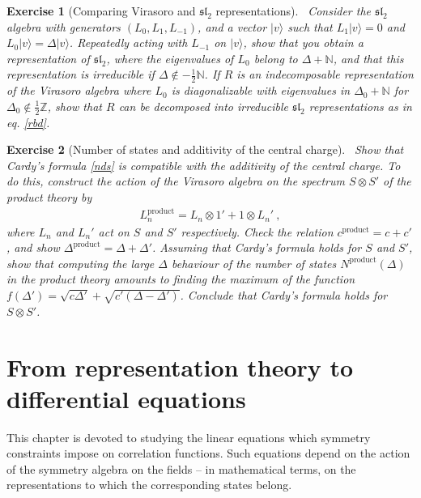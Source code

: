 \documentclass[12pt,a4paper,notitlepage]{report}
\numberwithin{equation}{section}
\theoremstyle{break}
\newtheorem{exo}{Exercise}[chapter]
\begin{document}
\begin{exo}[Comparing Virasoro and $\mathfrak{sl}_2$ representations]
 ~\label{exodis}
Consider the $\mathfrak{sl}_2$ algebra with generators $(L_0,L_1,L_{-1})$, and a vector $|v\rangle$ such that $L_1|v\rangle = 0 $ and $L_0|v\rangle = \Delta |v\rangle$.
Repeatedly acting with $L_{-1}$ on $|v\rangle$, show that you obtain a representation of $\mathfrak{sl}_2$, where the eigenvalues of $L_0$ belong to $\Delta+{\mathbb{N}}$, and that this representation is irreducible if $\Delta\notin -\frac12 \mathbb{N}$.
If $R$ is an indecomposable representation of the Virasoro algebra where $L_0$ is diagonalizable with eigenvalues in $\Delta_0+\mathbb{N}$ for $\Delta_0\notin\frac12 \mathbb{Z}$, show that $R$ can be decomposed into irreducible $\mathfrak{sl}_2$ representations as in eq. \eqref{rbd}.
\end{exo}


\begin{exo}[Number of states and additivity of the central charge]
 ~\label{exoacf} 
Show that Cardy's formula \eqref{nds} is compatible with the additivity of the central charge.
To do this, construct the action of the Virasoro algebra on the spectrum $S\otimes S'$ of the product theory by 
\begin{align}
 L_n^\text{product} = L_n\otimes 1' + 1\otimes L_n'\ ,
\end{align}
where $L_n$ and $L_n'$ act on $S$ and $S'$ respectively.
Check the relation $c^\text{product} = c+c'$, and show $\Delta^\text{product} = \Delta+\Delta'$.
Assuming that Cardy's formula holds for $S$ and $S'$, show that computing the large $\Delta$ behaviour of the number of states $N^\text{product}(\Delta)$ in the product theory amounts to finding the maximum of the function $f(\Delta') = \sqrt{c\Delta'} +\sqrt{c'(\Delta-\Delta')}$.
Conclude that Cardy's formula holds for $S\otimes S'$.
\end{exo}


\chapter{From representation theory to differential equations \label{secccs}}

This chapter is devoted to studying the linear equations which symmetry constraints impose on correlation functions.
Such equations depend on the action of the symmetry algebra on the fields -- in mathematical terms, on the representations to which the corresponding states belong. 
\end{document}

